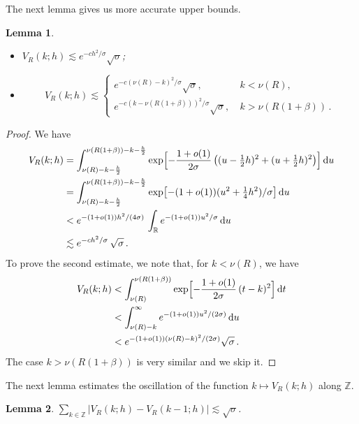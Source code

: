 \documentclass[11pt]{amsart}
\numberwithin{equation}{section}
\newtheorem{lemma}{Lemma}[section]
\newcommand{\bR}{\mathbb R}
\newcommand{\bZ}{\mathbb Z}
\begin{document}
The next lemma gives us more accurate upper bounds.

\begin{lemma}\label{Lemma5B}\mbox{}
\begin{itemize}
\item[{\rm (i)}] $V_R(k; h) \lesssim e^{-ch^2/\sigma}\sqrt{\sigma}$;
\item[{\rm (ii)}]
\[
V_R(k; h) \lesssim
\begin{cases}
e^{-c(\nu(R)-k)^2/\sigma}\sqrt{\sigma}, \ &k<\nu(R), \\
e^{-c(k-\nu(R(1+\beta)))^2/\sigma}\sqrt{\sigma}, \ &k>\nu(R(1+\beta))\,.
\end{cases}
\]
\end{itemize}
\end{lemma}

\begin{proof}
We have
\begin{align*}
V_R(k; h) &=
\int_{\nu (R)-k-\frac{h}2}^{\nu(R(1+\beta))-k-\frac{h}2}
\exp\Bigl[ -\frac{1+o(1)}{2\sigma}\,
\bigl( (u-\tfrac12 h)^2 + (u+\tfrac12 h)^2 \bigr)
\Bigr]\, {\rm d}u \\
&=
\int_{\nu (R)-k-\frac{h}2}^{\nu(R(1+\beta))-k-\frac{h}2}
\exp\bigl[ -(1+o(1))(u^2 + \tfrac14 h^2)/\sigma \bigr]\, {\rm d}u \\
&<
e^{-(1+o(1))h^2/(4\sigma)}\,
\int_{\bR} e^{-(1+o(1))u^2/\sigma}\, {\rm d}u \\
&\lesssim e^{-ch^2/\sigma}\, \sqrt{\sigma}\,.
\end{align*}
To prove the second estimate, we note that, for $k<\nu(R)$, we have
\begin{align*}
V_R(k; h) &<
\int_{\nu(R)}^{\nu(R(1+\beta))}
\exp\Bigl[ -\frac{1+o(1)}{2\sigma}\, (t-k)^2 \Bigr]\, {\rm d}t \\
&<
\int_{\nu(R)-k}^\infty e^{-(1+o(1))u^2/(2\sigma)}\, {\rm d}u \\
&< e^{-(1+o(1))(\nu(R)-k)^2/(2\sigma)}\sqrt{\sigma}\,.
\end{align*}
The case $k>\nu(R(1+\beta))$ is very similar and we skip it.
\end{proof}

The next lemma estimates the oscillation of the function $k\mapsto V_R(k; h)$ along $\mathbb Z$.

\begin{lemma}\label{Lemma5D}
$ \displaystyle \sum_{k\in\bZ}
|V_R(k; h) - V_R(k-1; h)| \lesssim \sqrt{\sigma} $.
\end{lemma}
\end{document}
